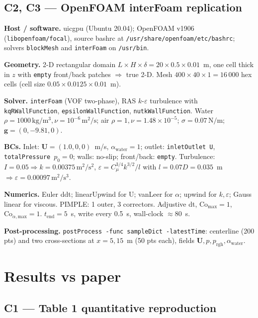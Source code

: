 \documentclass[11pt,a4paper]{article}
\begin{document}
\subsection{C2, C3 --- OpenFOAM interFoam replication}

\textbf{Host / software.} uicgpu (Ubuntu 20.04); OpenFOAM v1906
(\texttt{libopenfoam/focal}), source bashrc at \texttt{/usr/share/openfoam/etc/bashrc};
solvers \texttt{blockMesh} and \texttt{interFoam} on \texttt{/usr/bin}.

\textbf{Geometry.} 2-D rectangular domain $L\times H\times \delta = 20 \times 0.5 \times
0.01$~m, one cell thick in $z$ with \texttt{empty} front/back patches $\Rightarrow$ true
2-D. Mesh $400 \times 40 \times 1 = 16\,000$ hex cells (cell size $0.05 \times 0.0125
\times 0.01$~m).

\textbf{Solver.} \texttt{interFoam} (VOF two-phase), RAS $k$-$\varepsilon$ turbulence with
\texttt{kqRWallFunction}, \texttt{epsilonWallFunction}, \texttt{nutkWallFunction}. Water
$\rho=1000\,\mathrm{kg/m^3}, \nu=10^{-6}\,\mathrm{m^2/s}$; air $\rho=1, \nu=1.48\times
10^{-5}$; $\sigma=0.07\,\mathrm{N/m}$; $\mathbf{g}=(0,-9.81,0)$.

\textbf{BCs.} Inlet: $\mathbf{U}=(1.0,0,0)$~m/s, $\alpha_{\text{water}}=1$;
outlet: \texttt{inletOutlet U}, \texttt{totalPressure $p_0=0$};
walls: no-slip; front/back: \texttt{empty}. Turbulence: $I=0.05\Rightarrow
k=0.00375\,\mathrm{m^2/s^2}$, $\varepsilon=C_\mu^{3/4}k^{3/2}/l$ with
$l=0.07D=0.035$~m $\Rightarrow \varepsilon = 0.00097\,\mathrm{m^2/s^3}$.

\textbf{Numerics.} Euler ddt; linearUpwind for U; vanLeer for $\alpha$; upwind for
$k,\varepsilon$; Gauss linear for viscous. PIMPLE: 1 outer, 3 correctors. Adjustive dt,
$\mathrm{Co}_\mathrm{max}=1$, $\mathrm{Co}_{\alpha,\mathrm{max}}=1$. $t_\mathrm{end}=5$~s,
write every 0.5~s, wall-clock $\approx 80$~s.

\textbf{Post-processing.} \texttt{postProcess -func sampleDict -latestTime}: centerline (200 pts) and two cross-sections at $x=5, 15$~m (50 pts each), fields $\mathbf{U}, p, p_\mathrm{rgh}, \alpha_\mathrm{water}$.

\section{Results vs paper}

\subsection{C1 --- Table 1 quantitative reproduction}
\end{document}
